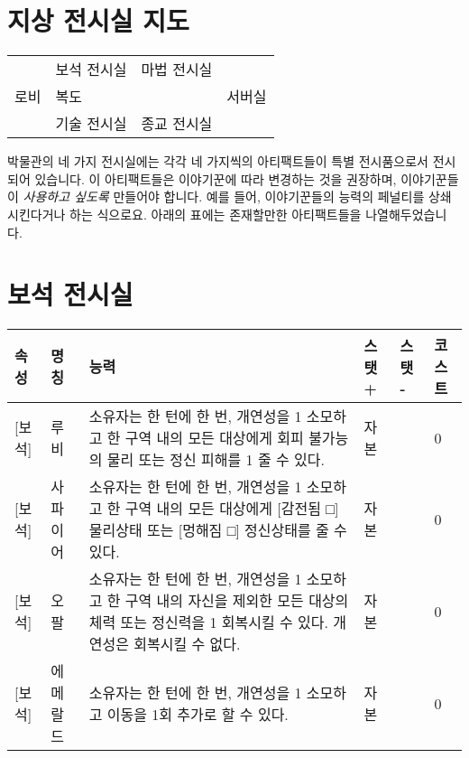 \documentclass[12pt]{report}
\begin{document}
	\section*{지상 전시실 지도}
	\begin{tabular}{|p{3cm}|p{3cm}|p{3cm}|p{3cm}|p{3cm}|p{3cm}|}
		\hline
		\multirow{5}{*}{로비} & \multicolumn{2}{p{3cm}|}{\multirow{2}{*}{보석 전시실}} & \multicolumn{2}{p{3cm}|}{\multirow{2}{*}{마법 전시실}} & \multirow{5}{*}{서버실} \\
		& \multicolumn{2}{p{3cm}|}{}                        & \multicolumn{2}{p{3cm}|}{}                        &                      \\ \cline{2-5}
		& \multicolumn{4}{p{6cm}|}{복도}                                                                     &                      \\ \cline{2-5}
		& \multicolumn{2}{p{3cm}|}{\multirow{2}{*}{기술 전시실}} & \multicolumn{2}{p{3cm}|}{\multirow{2}{*}{종교 전시실}} &                      \\
		& \multicolumn{2}{p{3cm}|}{}                        & \multicolumn{2}{c|}{}                        &                      \\ \hline
	\end{tabular}
	
	\bigskip
	
	박물관의 네 가지 전시실에는 각각 네 가지씩의 아티팩트들이 특별 전시품으로서 전시되어 있습니다. 이 아티팩트들은 이야기꾼에 따라 변경하는 것을 권장하며, 이야기꾼들이 \emph{사용하고 싶도록} 만들어야 합니다. 예를 들어, 이야기꾼들의 능력의 페널티를 상쇄시킨다거나 하는 식으로요. 아래의 표에는 존재할만한 아티팩트들을 나열해두었습니다.
	
	\section*{보석 전시실}
		\begin{tabularx}{\textwidth}{l|l|X|l|l|l}
			\textbf{속성} & \textbf{명칭} & \textbf{능력} & \textbf{스탯 +} & \textbf{스탯 -} & \textbf{코스트}\\ \hline \hline
			[저주][보석]& 루비   & 소유자는 한 턴에 한 번, 개연성을 1 소모하고 한 구역 내의 모든 대상에게 회피 불가능의 물리 또는 정신 피해를 1 줄 수 있다.   & 자본     & & 0    \\ \hline
			[저주][보석]& 사파이어   & 소유자는 한 턴에 한 번, 개연성을 1 소모하고 한 구역 내의 모든 대상에게 [감전됨 □] 물리상태 또는 [멍해짐 □] 정신상태를 줄 수 있다.   & 자본     & & 0    \\ \hline
			[저주][보석]& 오팔   &  소유자는 한 턴에 한 번, 개연성을 1 소모하고 한 구역 내의 자신을 제외한 모든 대상의 체력 또는 정신력을 1 회복시킬 수 있다. 개연성은 회복시킬 수 없다.  & 자본     & & 0    \\ \hline
			[저주][보석]& 에메랄드   & 소유자는 한 턴에 한 번, 개연성을 1 소모하고 이동을 1회 추가로 할 수 있다.   & 자본     & & 0    \\ 
		\end{tabularx}
	
\end{document}
